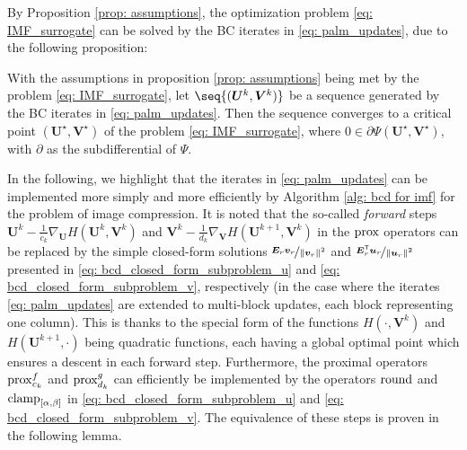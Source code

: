 By Proposition \ref{prop: assumptions}, the optimization problem \eqref{eq: IMF_surrogate} can be solved by the BC iterates in \eqref{eq: palm_updates}, due to the following proposition:
\begin{prop}\label{prop: convergence}
    With the assumptions in proposition \ref{prop: assumptions} being met by the problem \eqref{eq: IMF_surrogate}, let $\seq{(\bm U^k, \bm V^k)}$ be a sequence generated by the BC iterates in \eqref{eq: palm_updates}. Then the sequence converges to a critical point $(\bm U^\star, \bm V^\star)$ of the problem \eqref{eq: IMF_surrogate}, where $0 \in \partial \Psi(\bm U^\star, \bm V^\star)$, with $\partial$ as the subdifferential of $\Psi$.
\end{prop}

In the following, we highlight that the iterates in \eqref{eq: palm_updates} can be implemented more simply and more efficiently by Algorithm \ref{alg: bcd for imf} for the problem of image compression. It is noted that the so-called \emph{forward} steps $\bm U^k - \frac{1}{c_k} \nabla_{\bm U} H(\bm U^k, \bm V^k)$ and $\bm V^k - \frac{1}{d_k} \nabla_{\bm V} H(\bm U^{k+1}, \bm V^k)$ in the $\operatorname{prox}$ operators can be replaced by the simple closed-form solutions $\nicefrac{\bm{E}_r \bm{v}_r}{\lVert \bm{v}_r \rVert^2}$ and $\nicefrac{\bm{E}_r^\mathsf{T} \bm{u}_r}{\lVert \bm{u}_r \rVert^2}$ presented in \eqref{eq: bcd_closed_form_subproblem_u} and \eqref{eq: bcd_closed_form_subproblem_v}, respectively (in the case where the iterates \eqref{eq: palm_updates} are extended to multi-block updates, each block representing one column). This is thanks to the special form of the functions $H(\cdot, \bm V^k)$ and $H(\bm U^{k+1}, \cdot)$ being quadratic functions, each having a global optimal point which ensures a descent in each forward step. 
Furthermore, the proximal operators $\operatorname{prox}^f_{c_k}$ and $\operatorname{prox}^g_{d_k}$ can efficiently be implemented by the operators $\operatorname{round}$ and $\operatorname{clamp}_{[\alpha,\beta]}$ in \eqref{eq: bcd_closed_form_subproblem_u} and \eqref{eq: bcd_closed_form_subproblem_v}. The equivalence of these steps is proven in the following lemma.


